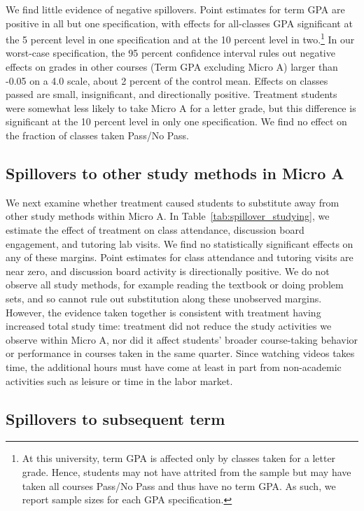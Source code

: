 We find little evidence of negative spillovers.
Point estimates for term GPA are positive in all but one specification, with effects for all-classes GPA significant at the 5 percent level in one specification and at the 10 percent level in two.\footnote{At this university, term GPA is affected only by classes taken for a letter grade.
Hence, students may not have attrited from the sample but may have taken all courses Pass/No Pass and thus have no term GPA.
As such, we report sample sizes for each GPA specification.
}
In our worst-case specification, the 95 percent confidence interval rules out negative effects on grades in other courses (Term GPA excluding Micro A) larger than -0.05 on a 4.0 scale, about 2 percent of the control mean.
Effects on classes passed are small, insignificant, and directionally positive.
Treatment students were somewhat less likely to take Micro A for a letter grade, but this difference is significant at the 10 percent level in only one specification.
We find no effect on the fraction of classes taken Pass/No Pass.

\subsection{Spillovers to other study methods in Micro A}\label{subsec:spillovers_studying}

We next examine whether treatment caused students to substitute away from other study methods within Micro A.
In Table~\ref{tab:spillover_studying}, we estimate the effect of treatment on class attendance, discussion board engagement, and tutoring lab visits.
We find no statistically significant effects on any of these margins.
Point estimates for class attendance and tutoring visits are near zero, and discussion board activity is directionally positive.
We do not observe all study methods, for example reading the textbook or doing problem sets, and so cannot rule out substitution along these unobserved margins.
However, the evidence taken together is consistent with treatment having increased total study time: treatment did not reduce the study activities we observe within Micro A, nor did it affect students' broader course-taking behavior or performance in courses taken in the same quarter.
Since watching videos takes time, the additional hours must have come at least in part from non-academic activities such as leisure or time in the labor market.


\subsection{Spillovers to subsequent term}\label{subsec:spillovers_micro_b}

